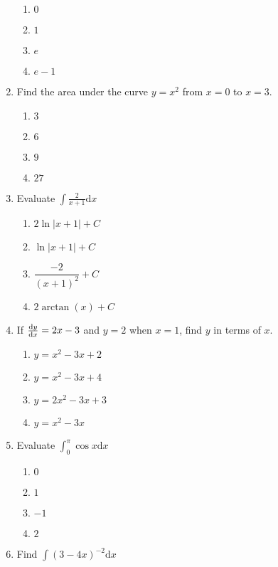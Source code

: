 \begin{multicols}{2}
\begin{enumerate}[label={\arabic*.}]
\begin{enumerate}[label={\Alph*.}]
        \item \(0\)
        \item \(1\)
        \item \(e\)
        \item \(e-1\)
      \end{enumerate}
    \item Find the area under the curve \(y=x^2\) from \(x=0\) to \(x=3\).
      \begin{enumerate}[label={\Alph*.}]
        \item \(3\)
        \item \(6\)
        \item \(9\)
        \item \(27\)
      \end{enumerate}
    \item Evaluate \(\displaystyle \int \frac{2}{x+1} \mathrm{d}x\)
      \begin{enumerate}[label={\Alph*.}]
        \item \(2\ln|x+1| + C\)
        \item \(\ln|x+1| + C\)
        \item \(\dfrac{-2}{(x+1)^2} + C\)
        \item \(2\arctan(x) + C\)
      \end{enumerate}
    \item If \(\frac{\mathrm{d}y}{\mathrm{d}x} = 2x - 3\) and \(y=2\) when \(x=1\), find \(y\) in terms of \(x\).
      \begin{enumerate}[label={\Alph*.}]
        \item \(y = x^2 - 3x + 2\)
        \item \(y = x^2 - 3x + 4\)
        \item \(y = 2x^2 - 3x + 3\)
        \item \(y = x^2 - 3x\)
      \end{enumerate}
    \item Evaluate \(\displaystyle \int_{0}^{\pi} \cos x \mathrm{d}x\)
      \begin{enumerate}[label={\Alph*.}]
        \item \(0\)
        \item \(1\)
        \item \(-1\)
        \item \(2\)
      \end{enumerate}
    \item Find \(\displaystyle \int (3-4x)^{-2} \mathrm{d}x\)
      \begin{enumerate}[label={\Alph*.}]

\end{enumerate}
\end{enumerate}
\end{multicols}
